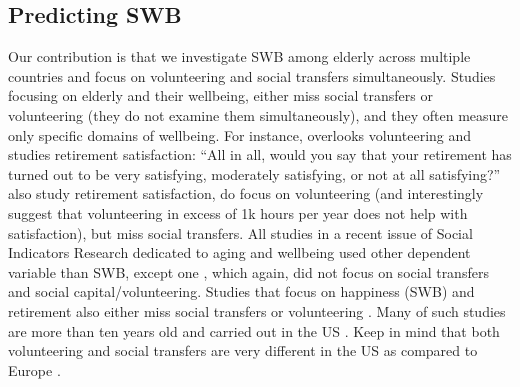 \documentclass[10pt, letterpaper]{article}
\begin{document}
\begin{spacing}{1.4}
\section{Predicting SWB}

Our contribution is that we  investigate SWB among elderly
across multiple countries and focus on volunteering and social transfers simultaneously.  
%
Studies focusing on elderly and their wellbeing, either miss social
transfers or volunteering (they do not examine them simultaneously), and they
often measure only specific domains of wellbeing. For instance,
\citet{bender12} overlooks volunteering and studies retirement satisfaction: ``All in all,
would you say that your retirement has turned out to be very satisfying,
moderately satisfying, or not at all satisfying?''
\citet{butrica2005satisfaction} also study retirement satisfaction, do focus on
volunteering (and interestingly suggest that volunteering in excess of 1k hours
per year does not help with satisfaction), but miss social transfers. All studies in a recent issue of Social Indicators Research \citep{jurges12} dedicated to aging and
wellbeing used other dependent variable than SWB, except one
\citep{angelini2012age}, which again, did not focus on social transfers and social capital/volunteering.
Studies that focus on happiness (SWB) and retirement also either miss social
transfers or volunteering
\citep{dingemans2014involuntary,dingemans2015retirement,nikolova2014employment,angelini2012age}.
 Many of such studies are more than ten years old and carried out in the US
\citep{wheeler98,ferring10}. %
 Keep in mind that both volunteering and social transfers are very different in
 the US as compared to Europe \citep{tocqueville03,fischer10, alesina05al,alesina01,lipset00}.


\end{spacing}
\end{document}
